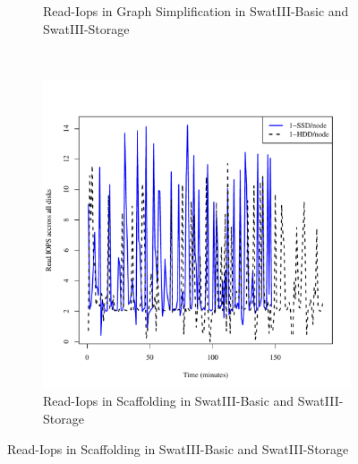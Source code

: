 \documentclass[conference]{IEEEtran}
\begin{document}
\begin{figure}[H]
\begin{subfigure}[b]{0.2\textwidth}
                \caption{Read-Iops in Graph Simplification in SwatIII-Basic and SwatIII-Storage}
                \label{fig:ECHddSsdRdIops}
        \end{subfigure}
        ~ %
        \begin{subfigure}[b]{0.2\textwidth}
                \includegraphics[width=\textwidth]{Figure/SystemData/Plots/SCFHddSsdRdIops.pdf}
                \caption{Read-Iops in Scaffolding in SwatIII-Basic and SwatIII-Storage}
                \label{fig:SCFHddSsdRdIops}
        \end{subfigure}
        

\end{figure}
\end{document}
